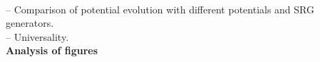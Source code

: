 \documentclass[preprintnumbers,floatfix,aps,prc,preprint,nofootinbib]{revtex4-1}
\begin{document}
%
\\
-- Comparison of potential evolution with different potentials and SRG generators.
\\
-- Universality.
\\
\textbf{Analysis of figures}
\\
%
	
\end{document}
